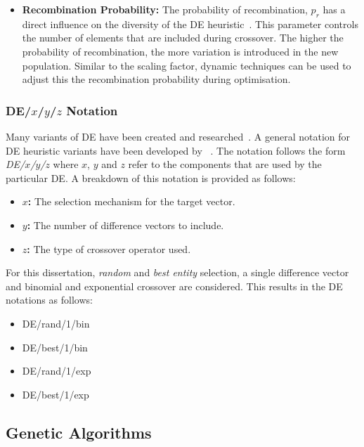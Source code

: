 {\begin{itemize}
	\item \textbf{Recombination Probability:} The probability of recombination, $p_{r}$ has a direct influence on the diversity of the \acs{DE} heuristic~\cite{ref:engelbrecht:2007}. This parameter controls the number of elements that are included during crossover. The higher the probability of recombination, the more variation is introduced in the new population. Similar to the scaling factor, dynamic techniques can be used to adjust this the recombination probability during optimisation.
\end{itemize}

\subsubsection{DE/$x$/$y$/$z$ Notation}

Many variants of \acs{DE} have been created and researched~\cite{ref:mezura:2006}. A general notation for \acs{DE} heuristic variants have been developed by \citeauthor{ref:storn:1996}~\cite{ref:storn:1996, ref:storn:1997}. The notation follows the form \textit{DE/$x$/$y$/$z$} where $x$, $y$ and $z$ refer to the components that are used by the particular \acs{DE}. A breakdown of this notation is provided as follows:

\begin{itemize}
	\item \textbf{$x$:} The selection mechanism for the target vector.
	\item \textbf{$y$:} The number of difference vectors to include.
	\item \textbf{$z$:} The type of crossover operator used.
\end{itemize}

For this dissertation, \textit{random} and \textit{best entity} selection, a single difference vector and binomial and exponential crossover are considered. This results in the \acs{DE} notations as follows:

\begin{itemize}
	\item DE/rand/1/bin
	\item DE/best/1/bin
	\item DE/rand/1/exp
	\item DE/best/1/exp
\end{itemize}

\subsection{Genetic Algorithms}\label{sec:heuristics:mh:ga}

}
